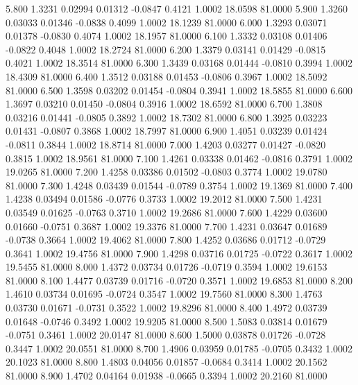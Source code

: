    5.800   1.3231   0.02994   0.01312  -0.0847   0.4121   1.0002  18.0598  81.0000
   5.900   1.3260   0.03033   0.01346  -0.0838   0.4099   1.0002  18.1239  81.0000
   6.000   1.3293   0.03071   0.01378  -0.0830   0.4074   1.0002  18.1957  81.0000
   6.100   1.3332   0.03108   0.01406  -0.0822   0.4048   1.0002  18.2724  81.0000
   6.200   1.3379   0.03141   0.01429  -0.0815   0.4021   1.0002  18.3514  81.0000
   6.300   1.3439   0.03168   0.01444  -0.0810   0.3994   1.0002  18.4309  81.0000
   6.400   1.3512   0.03188   0.01453  -0.0806   0.3967   1.0002  18.5092  81.0000
   6.500   1.3598   0.03202   0.01454  -0.0804   0.3941   1.0002  18.5855  81.0000
   6.600   1.3697   0.03210   0.01450  -0.0804   0.3916   1.0002  18.6592  81.0000
   6.700   1.3808   0.03216   0.01441  -0.0805   0.3892   1.0002  18.7302  81.0000
   6.800   1.3925   0.03223   0.01431  -0.0807   0.3868   1.0002  18.7997  81.0000
   6.900   1.4051   0.03239   0.01424  -0.0811   0.3844   1.0002  18.8714  81.0000
   7.000   1.4203   0.03277   0.01427  -0.0820   0.3815   1.0002  18.9561  81.0000
   7.100   1.4261   0.03338   0.01462  -0.0816   0.3791   1.0002  19.0265  81.0000
   7.200   1.4258   0.03386   0.01502  -0.0803   0.3774   1.0002  19.0780  81.0000
   7.300   1.4248   0.03439   0.01544  -0.0789   0.3754   1.0002  19.1369  81.0000
   7.400   1.4238   0.03494   0.01586  -0.0776   0.3733   1.0002  19.2012  81.0000
   7.500   1.4231   0.03549   0.01625  -0.0763   0.3710   1.0002  19.2686  81.0000
   7.600   1.4229   0.03600   0.01660  -0.0751   0.3687   1.0002  19.3376  81.0000
   7.700   1.4231   0.03647   0.01689  -0.0738   0.3664   1.0002  19.4062  81.0000
   7.800   1.4252   0.03686   0.01712  -0.0729   0.3641   1.0002  19.4756  81.0000
   7.900   1.4298   0.03716   0.01725  -0.0722   0.3617   1.0002  19.5455  81.0000
   8.000   1.4372   0.03734   0.01726  -0.0719   0.3594   1.0002  19.6153  81.0000
   8.100   1.4477   0.03739   0.01716  -0.0720   0.3571   1.0002  19.6853  81.0000
   8.200   1.4610   0.03734   0.01695  -0.0724   0.3547   1.0002  19.7560  81.0000
   8.300   1.4763   0.03730   0.01671  -0.0731   0.3522   1.0002  19.8296  81.0000
   8.400   1.4972   0.03739   0.01648  -0.0746   0.3492   1.0002  19.9205  81.0000
   8.500   1.5083   0.03814   0.01679  -0.0751   0.3461   1.0002  20.0147  81.0000
   8.600   1.5000   0.03878   0.01726  -0.0728   0.3447   1.0002  20.0551  81.0000
   8.700   1.4906   0.03959   0.01785  -0.0705   0.3432   1.0002  20.1023  81.0000
   8.800   1.4803   0.04056   0.01857  -0.0684   0.3414   1.0002  20.1562  81.0000
   8.900   1.4702   0.04164   0.01938  -0.0665   0.3394   1.0002  20.2160  81.0000
